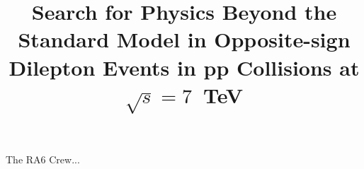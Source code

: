 \documentclass{cmspaper}
\begin{document}
     

\begin{titlepage}
    \pagestyle {plain}

  \title {Search for Physics Beyond the Standard Model in Opposite-sign Dilepton Events in pp Collisions at $\sqrt{s}=7$~TeV }
\begin{Authlist}
The RA6 Crew...
\end{Authlist}


\end{titlepage}



\newpage
\linenumbers


















\appendix
%
\end{document}
